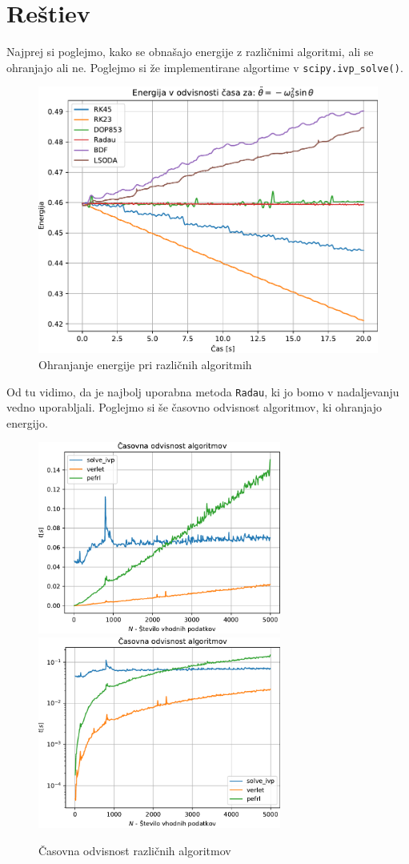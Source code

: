 \section{Reštiev}
Najprej si poglejmo, kako se obnašajo energije z različnimi algoritmi,
ali se ohranjajo ali ne. Poglejmo si že implementirane
algortime v \verb|scipy.ivp_solve()|.
\begin{figure}[h]
    \centering
    \includegraphics[width=12cm]{pdfs/energije.pdf}
    \caption{Ohranjanje energije pri različnih algoritmih}
\end{figure}
Od tu vidimo, da je najbolj uporabna metoda \verb|Radau|, ki jo bomo v nadaljevanju vedno uporabljali.
Poglejmo si še časovno odvisnost algoritmov, ki ohranjajo energijo.
\begin{figure}[h]
    \centering
    \includegraphics[width=8cm]{pdfs/time.pdf}
    \hfill
    \includegraphics[width=8cm]{pdfs/timelog.pdf}
    
    \caption{Časovna odvisnost različnih algoritmov}
\end{figure}
